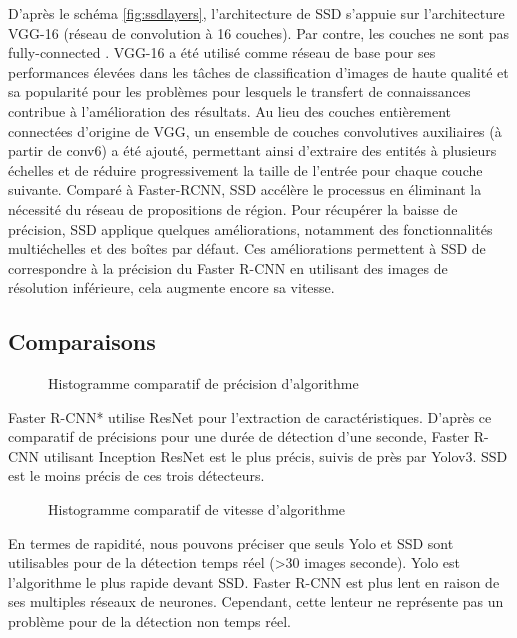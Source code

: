 \documentclass[debug,nodate,hideweeklyreports,noposter]{polytech/polytech}
\begin{document}
D’après le schéma \autoref{fig:ssdlayers}, l’architecture de SSD s’appuie sur l’architecture VGG-16 (réseau de convolution à 16 couches). Par contre, les couches ne sont pas fully-connected . VGG-16 a été utilisé comme réseau de base pour ses performances élevées dans les tâches de classification d’images de haute qualité et sa popularité pour les problèmes pour lesquels le transfert de connaissances contribue à l’amélioration des résultats. Au lieu des couches entièrement connectées d'origine de VGG, un ensemble de couches convolutives auxiliaires (à partir de conv6) a été ajouté, permettant ainsi d'extraire des entités à plusieurs échelles et de réduire progressivement la taille de l'entrée pour chaque couche suivante.
Comparé à Faster-RCNN, SSD accélère le processus en éliminant la nécessité du réseau de propositions de région. Pour récupérer la baisse de précision, SSD applique quelques améliorations, notamment des fonctionnalités multiéchelles et des boîtes par défaut. Ces améliorations permettent à SSD de correspondre à la précision du Faster R-CNN en utilisant des images de résolution inférieure, cela augmente encore sa vitesse.

\subsection{Comparaisons}

\begin{figure}
  \caption{Histogramme comparatif de précision d'algorithme}
  \label{fig:compaccura}
\end{figure}

Faster R-CNN* utilise ResNet pour l’extraction de caractéristiques.
D’après ce comparatif de précisions pour une durée de détection d’une seconde, Faster R-CNN utilisant Inception ResNet est le plus précis, suivis de près par Yolov3. SSD est le moins précis de ces trois détecteurs.

\begin{figure}
  \caption{Histogramme comparatif de vitesse d'algorithme}
  \label{fig:compspeed}
\end{figure}

En termes de rapidité, nous pouvons préciser que seuls Yolo et SSD sont utilisables pour de la détection temps réel (>30 images seconde). Yolo est l’algorithme le plus rapide devant SSD. Faster R-CNN est plus lent en raison de ses multiples réseaux de neurones. Cependant, cette lenteur ne représente pas un problème pour de la détection non temps réel.
\end{document}
